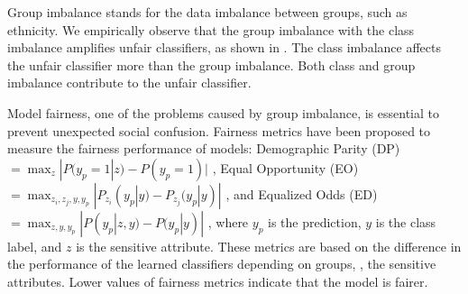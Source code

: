 Group imbalance stands for the data imbalance between groups, such as ethnicity. 
We empirically observe that the group imbalance with the class imbalance amplifies 
unfair classifiers, as shown in .
The class imbalance affects the unfair classifier more than the group imbalance.
Both class and group imbalance contribute to the unfair classifier.

Model fairness, one of the problems caused by group imbalance, is essential to prevent unexpected social confusion.
Fairness metrics have been proposed to measure the fairness performance of models:
Demographic Parity (DP) $=\max_z|P(y_p{=}1|z) {-} P(y_p{=}1)|$ \cite{10.1145/2783258.2783311},
Equal Opportunity (EO) $=\max_{z_i, z_j, y, y_p}|P_{z_i}(y_p|y) {-} P_{z_j}(y_p|y)|$ \cite{hardt2016equality, jung2022learning},
and Equalized Odds (ED) $=\max_{z, y, y_p}|P(y_p|z, y) {-} P(y_p|y)|$ \cite{hardt2016equality}, where $y_p$ is the prediction, $y$ is the class label, and $z$ is the sensitive attribute.
These metrics are based on the difference in the performance of the learned classifiers depending on groups, \ie, the sensitive attributes.
Lower values of fairness metrics indicate that the model is fairer.


